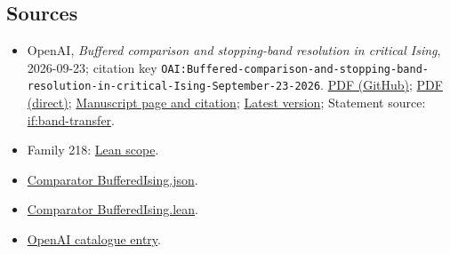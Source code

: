 \documentclass[11pt]{article}
\begin{document}
\subsection{Sources}
\begin{itemize}
\item OpenAI, \emph{Buffered comparison and stopping-band resolution in critical Ising}, 2026-09-23; citation key \texttt{OAI:Buffered-comparison-and-stopping-band-resolution-in-critical-Ising-September-23-2026}. \href{https://github.com/openai/math/blob/adc7f1241b42e322a6451854ab7e4b4c146bf78a/preprints/Buffered-comparison-and-stopping-band-resolution-in-critical-Ising-September-23-2026/paper.pdf}{PDF (GitHub)}; \href{https://github.com/openai/math/raw/adc7f1241b42e322a6451854ab7e4b4c146bf78a/preprints/Buffered-comparison-and-stopping-band-resolution-in-critical-Ising-September-23-2026/paper.pdf}{PDF (direct)}; \href{https://github.com/openai/math/blob/adc7f1241b42e322a6451854ab7e4b4c146bf78a/preprints/Buffered-comparison-and-stopping-band-resolution-in-critical-Ising-September-23-2026/README.md}{Manuscript page and citation}; \href{https://github.com/openai/math/blob/main/preprints/Buffered-comparison-and-stopping-band-resolution-in-critical-Ising-September-23-2026/paper.pdf}{Latest version}; Statement source: \href{https://github.com/openai/math/blob/adc7f1241b42e322a6451854ab7e4b4c146bf78a/preprints/Buffered-comparison-and-stopping-band-resolution-in-critical-Ising-September-23-2026/build/sections/descriptors.tex\#L10}{if:band-transfer}.
\item Family 218: \href{https://github.com/openai/math/blob/adc7f1241b42e322a6451854ab7e4b4c146bf78a/lean/docs/218.md}{Lean scope}.
\item \href{https://github.com/openai/math/blob/adc7f1241b42e322a6451854ab7e4b4c146bf78a/lean/ComparatorChallenges/BufferedIsing.json}{Comparator BufferedIsing.json}.
\item \href{https://github.com/openai/math/blob/adc7f1241b42e322a6451854ab7e4b4c146bf78a/lean/ComparatorChallenges/BufferedIsing.lean}{Comparator BufferedIsing.lean}.
\item \href{https://github.com/openai/math/blob/adc7f1241b42e322a6451854ab7e4b4c146bf78a/CONTENTS.md}{OpenAI catalogue entry}.
\end{itemize}
\end{document}
